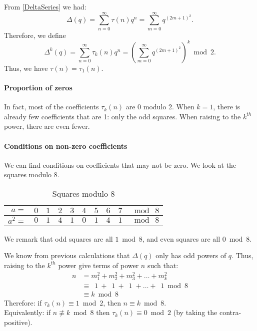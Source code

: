 From \ref{DeltaSeries} we had:
$$
\Delta(q) 
= \sum_{n=0}^{\infty} \tau(n)q^n
= \sum_{m=0}^{\infty} q^{(2m+1)^2}.
$$
Therefore, we define 
$$
\Delta^{k}(q) 
= \sum_{n=0}^{\infty} \tau_k(n)q^n
= \left( \sum_{m=0}^{\infty} q^{(2m+1)^2} \right)^k \bmod 2.
$$
Thus, we have $\tau(n)=\tau_1(n)$.

\paragraph{Proportion of zeros}
In fact, most of the coefficients $\tau_k(n)$ are $0$ modulo 2.
When $k=1$, there is already few coefficients that are 1: only the odd squares.
When raising to the $k^{th}$ power, there are even fewer.

\paragraph{Conditions on non-zero coefficients}
We can find conditions on coefficients that may not be zero.
We look at the squares modulo 8.
\begin{table}[!ht]

	\begin{center}
		\begin{tabular}{|r||c|c|c|c|c|c|c|c||l|}
			\hline
			$a=$ & $0$ & $1$ & $2$ & $3$ & $4$ & $5$ & $6$ & $7$ & $\bmod \ 8$ \\
			\hline
			$a^2=$ & \color{BrickRed} $0$ & \color{ForestGreen} $1$ & \color{BrickRed} $4$ & \color{ForestGreen} $1$ & \color{BrickRed} $0$ & \color{ForestGreen} $1$ & \color{BrickRed} $4$ & \color{ForestGreen} $1$ & $\bmod \ 8$ \\
			\hline

		\end{tabular}
	\end{center}
	\caption{Squares modulo $8$}
	\label{table:SquaresMod8}
\end{table}
We remark that odd squares are all $1 \bmod 8$, and even squares are all $0 \bmod 8$.

We know from previous calculations that $\Delta(q)$ only has odd powers of $q$.
Thus, raising to the $k^{th}$ power give terms of power $n$ such that:
\begin{align*}
n &= m_1^2 + m_2^2 + m_3^2 + \dots + m_k^2 \\
&\equiv \:\; 1 \ + \:\; 1 \ + \:\; 1 \; + \dots + \:\; 1 \bmod 8 \\
&\equiv k \bmod 8
\end{align*}
Therefore: if $\tau_k(n) \equiv 1 \bmod 2$, then $n \equiv k \bmod 8$.\\
Equivalently: if $n \not\equiv k \bmod 8$ then $\tau_k(n) \equiv 0 \bmod 2$ (by taking the contra-positive).

